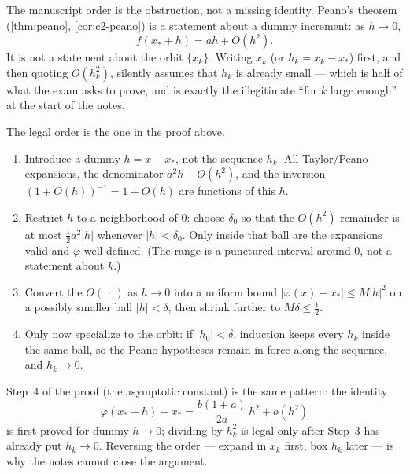 \documentclass[11pt,a4paper]{article}
\begin{document}
\begin{remark}
\label{rem:p1-h-first}
The manuscript order is the obstruction, not a missing identity. Peano's theorem (\cref{thm:peano}, \cref{cor:c2-peano}) is a statement about a dummy increment: as \(h\to 0\),
\[
f(x_{*}+h)=ah+O(h^{2}).
\]
It is not a statement about the orbit \(\{x_{k}\}\). Writing \(x_{k}\) (or \(h_{k}=x_{k}-x_{*}\)) first, and then quoting \(O(h_{k}^{2})\), silently assumes that \(h_{k}\) is already small --- which is half of what the exam asks to prove, and is exactly the illegitimate ``for \(k\) large enough'' at the start of the notes.

The legal order is the one in the proof above.

\begin{enumerate}[label=\textup{\arabic*.}]
    \item Introduce a dummy \(h=x-x_{*}\), not the sequence \(h_{k}\). All Taylor/Peano expansions, the denominator \(a^{2}h+O(h^{2})\), and the inversion \((1+O(h))^{-1}=1+O(h)\) are functions of this \(h\).
    \item Restrict \(h\) to a neighborhood of \(0\): choose \(\delta_{0}\) so that the \(O(h^{2})\) remainder is at most \(\tfrac12 a^{2}|h|\) whenever \(|h|<\delta_{0}\). Only inside that ball are the expansions valid and \(\varphi\) well-defined. (The range is a punctured interval around \(0\), not a statement about \(k\).)
    \item Convert the \(O(\,\cdot\,)\) as \(h\to 0\) into a uniform bound \(|\varphi(x)-x_{*}|\le M|h|^{2}\) on a possibly smaller ball \(|h|<\delta\), then shrink further to \(M\delta\le\tfrac12\).
    \item Only now specialize to the orbit: if \(|h_{0}|<\delta\), induction keeps every \(h_{k}\) inside the same ball, so the Peano hypotheses remain in force along the sequence, and \(h_{k}\to 0\).
\end{enumerate}

Step~4 of the proof (the asymptotic constant) is the same pattern: the identity
\[
\varphi(x_{*}+h)-x_{*}
=
\frac{b(1+a)}{2a}\,h^{2}+o(h^{2})
\]
is first proved for dummy \(h\to 0\); dividing by \(h_{k}^{2}\) is legal only after Step~3 has already put \(h_{k}\to 0\). Reversing the order --- expand in \(x_{k}\) first, box \(h_{k}\) later --- is why the notes cannot close the argument.
\end{remark}
\end{document}
